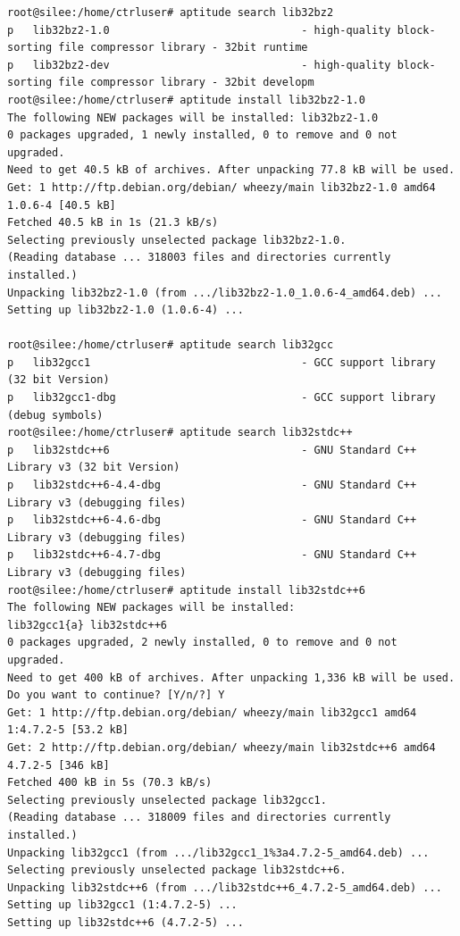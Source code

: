 \documentclass[11pt
  , a4paper
  , article
  , oneside
]{memoir}
\begin{document}
\begin{lstlisting}[style=termstyle]
root@silee:/home/ctrluser# aptitude search lib32bz2
p   lib32bz2-1.0                              - high-quality block-sorting file compressor library - 32bit runtime 
p   lib32bz2-dev                              - high-quality block-sorting file compressor library - 32bit developm
root@silee:/home/ctrluser# aptitude install lib32bz2-1.0
The following NEW packages will be installed: lib32bz2-1.0 
0 packages upgraded, 1 newly installed, 0 to remove and 0 not upgraded.
Need to get 40.5 kB of archives. After unpacking 77.8 kB will be used.
Get: 1 http://ftp.debian.org/debian/ wheezy/main lib32bz2-1.0 amd64 1.0.6-4 [40.5 kB]
Fetched 40.5 kB in 1s (21.3 kB/s)       
Selecting previously unselected package lib32bz2-1.0.
(Reading database ... 318003 files and directories currently installed.)
Unpacking lib32bz2-1.0 (from .../lib32bz2-1.0_1.0.6-4_amd64.deb) ...
Setting up lib32bz2-1.0 (1.0.6-4) ...

root@silee:/home/ctrluser# aptitude search lib32gcc
p   lib32gcc1                                 - GCC support library (32 bit Version)                               
p   lib32gcc1-dbg                             - GCC support library (debug symbols)                                
root@silee:/home/ctrluser# aptitude search lib32stdc++
p   lib32stdc++6                              - GNU Standard C++ Library v3 (32 bit Version)                       
p   lib32stdc++6-4.4-dbg                      - GNU Standard C++ Library v3 (debugging files)                      
p   lib32stdc++6-4.6-dbg                      - GNU Standard C++ Library v3 (debugging files)                      
p   lib32stdc++6-4.7-dbg                      - GNU Standard C++ Library v3 (debugging files)                      
root@silee:/home/ctrluser# aptitude install lib32stdc++6
The following NEW packages will be installed:
lib32gcc1{a} lib32stdc++6 
0 packages upgraded, 2 newly installed, 0 to remove and 0 not upgraded.
Need to get 400 kB of archives. After unpacking 1,336 kB will be used.
Do you want to continue? [Y/n/?] Y
Get: 1 http://ftp.debian.org/debian/ wheezy/main lib32gcc1 amd64 1:4.7.2-5 [53.2 kB]
Get: 2 http://ftp.debian.org/debian/ wheezy/main lib32stdc++6 amd64 4.7.2-5 [346 kB]
Fetched 400 kB in 5s (70.3 kB/s)       
Selecting previously unselected package lib32gcc1.
(Reading database ... 318009 files and directories currently installed.)
Unpacking lib32gcc1 (from .../lib32gcc1_1%3a4.7.2-5_amd64.deb) ...
Selecting previously unselected package lib32stdc++6.
Unpacking lib32stdc++6 (from .../lib32stdc++6_4.7.2-5_amd64.deb) ...
Setting up lib32gcc1 (1:4.7.2-5) ...
Setting up lib32stdc++6 (4.7.2-5) ...


\end{lstlisting}
\end{document}
